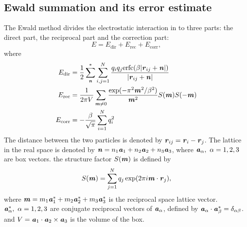 \documentclass[journal=jacsat,manuscript=article]{achemso}
\newcommand{\redc}[1]{{\color{black} #1}}
\renewcommand{\v}[1]{\textbf{\textit{#1}}}
\begin{document}
\subsection{Ewald summation and its error estimate}
The Ewald method divides the electrostatic interaction in to three
parts: the direct part, the reciprocal part and the correction
part:
\begin{equation}
E = E_{\textrm{dir}} + E_{\textrm{rec}} + E_{\textrm{corr}},
\end{equation}
where 
\begin {align}\label{eqn:tmp2}
E_{\textrm{dir}} & = \frac12 \sum^{\ast}_{\v n}
\sum_{i,j = 1}^{N} \frac{q_iq_j \textrm{erfc}(\beta \vert\v{r}_{ij} + \v{n}\vert)}
{\vert\v{r}_{ij} + \v{n}\vert} \\\label{eqn:tmp3}
E_{\textrm{rec}} & = \frac1{2\pi V} \sum_{\v m \neq 0}
\frac{\exp(-\pi^2\v m^2 / \beta^2)}{\v m^2} S(\v m) S(-\v m) \\\label{eqn:tmp4}
 E_{\textrm{corr}}& = -\frac\beta{\sqrt \pi} \sum_{i=1}^N q_i^2
\end {align}
The distance between the two particles is denoted by $\v r_{ij} = \v
r_i - \v r_j$.  The lattice in the real space is denoted
by $\v n = n_1 \v a_1 + n_2 \v a_2 + n_3 \v a_3$, where $\v a_\alpha,
\ \alpha=1,2,3$ are box vectors. the structure factor $S(\v m)$ is
defined by
\begin{equation}\label{sm1}
S(\v m) = \sum_{j=1}^N q_j \exp (2 \pi i \v m \cdot \v r_j),
\end{equation}
where $\v m = m_1 \v a_1^\ast + m_2 \v a_2^\ast + m_3 \v a_3^\ast$ is
the reciprocal space lattice \redc{vector}. $\v a_\alpha^\ast,\ \alpha = 1,
2, 3$ are conjugate reciprocal vectors of $\v a_\alpha$, defined by
$\v a_\alpha \cdot \v a_\beta^\ast = \delta_{\alpha\beta}$. and $V =
\v a_1 \cdot \v a_2 \times \v a_3$ is the volume of the box.
\end{document}
